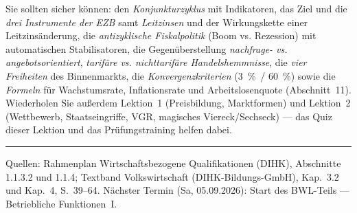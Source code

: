 \documentclass[11pt, a4paper]{article}
\begin{document}
\begin{merksatz}[title={\bfseries Wichtig für die Prüfungsvorbereitung (Block 1.1 komplett)}]
Sie sollten sicher können: den \emph{Konjunkturzyklus} mit Indikatoren, das Ziel und die
\emph{drei Instrumente der EZB} samt \emph{Leitzinsen} und der Wirkungskette einer
Leitzinsänderung, die \emph{antizyklische Fiskalpolitik} (Boom vs. Rezession) mit
automatischen Stabilisatoren, die Gegenüberstellung \emph{nachfrage- vs.
angebotsorientiert}, \emph{tarifäre vs. nichttarifäre Handelshemmnisse}, die \emph{vier
Freiheiten} des Binnenmarkts, die \emph{Konvergenzkriterien} (3~\%~/ 60~\%) sowie die
\emph{Formeln} für Wachstumsrate, Inflationsrate und Arbeitslosenquote (Abschnitt~11).
Wiederholen Sie außerdem
Lektion~1 (Preisbildung, Marktformen) und Lektion~2 (Wettbewerb, Staatseingriffe, VGR,
magisches Viereck/Sechseck) --- das Quiz dieser Lektion und das Prüfungstraining helfen dabei.
\end{merksatz}

\vspace{1em}
\hrule
\vspace{0.8em}
\noindent\textsf{\small Quellen: Rahmenplan Wirtschaftsbezogene Qualifikationen (DIHK), Abschnitte 1.1.3.2 und 1.1.4;
Textband Volkswirtschaft (DIHK-Bildungs-GmbH), Kap.~3.2 und Kap.~4, S.~39--64. Nächster Termin (Sa, 05.09.2026):
Start des BWL-Teils --- Betriebliche Funktionen~I.}
\end{document}
